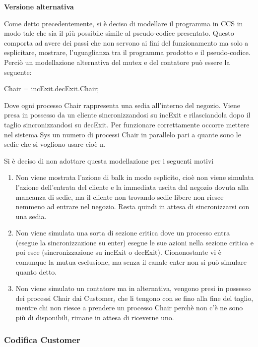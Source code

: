 \textbf{Versione alternativa}

Come detto precedentemente, si è deciso di modellare il programma in CCS in modo tale che sia il più possibile simile al pseudo-codice presentato. Questo comporta ad avere dei passi che non servono ai fini del funzionamento ma solo a esplicitare, mostrare, l'uguaglianza tra il programma prodotto e il pseudo-codice. Perciò un modellazione alternativa del \textsf{mutex} e del contatore può essere la seguente:

\textsf{Chair = incExit.decExit.Chair;}

Dove ogni processo \textsf{Chair} rappresenta una sedia all'interno del negozio. Viene presa in possesso da un cliente sincronizzandosi su \textsf{incExit} e rilasciandola dopo il taglio sincronizzandosi su \textsf{decExit}. Per funzionare correttamente occorre mettere nel sistema \textsf{Sys} un numero di processi \textsf{Chair} in parallelo pari a quante sono le sedie che si vogliono usare cioè n. 

Si è deciso di non adottare questa modellazione per i seguenti motivi 
\begin{enumerate}
	\item Non viene mostrata l'azione di \textsf{balk} in modo esplicito, cioè non viene simulata l'azione dell'entrata del cliente e la immediata uscita dal negozio dovuta alla mancanza di sedie, ma il cliente non trovando sedie libere non riesce nemmeno ad entrare nel negozio. Resta quindi in attesa di sincronizzarsi con una sedia.
	\item Non viene simulata una sorta di sezione critica dove un processo entra (esegue la sincronizzazione su \textsf{enter}) esegue le sue azioni nella sezione critica e poi esce (sincronizzazione su \textsf{incExit} o \textsf{decExit}). Ciononostante vi è comunque la mutua esclusione, ma senza il canale \textsf{enter} non si può simulare quanto detto.
	\item Non viene simulato un contatore ma in alternativa, vengono presi in possesso dei processi \textsf{Chair} dai \textsf{Customer$_{i}$} che li tengono con se fino alla fine del taglio, mentre chi non riesce a prendere un processo \textsf{Chair} perchè non c'è ne sono più di disponibili, rimane in attesa di riceverne uno.
\end{enumerate}


\subsubsection{Codifica Customer}

